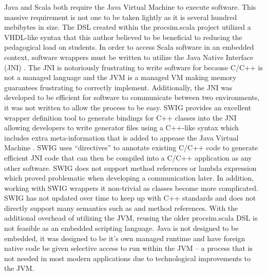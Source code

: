 Java and Scala both require the Java Virtual Machine to execute software. This massive requirement is not one to be taken lightly as it is several hundred mebibytes in size. The DSL created within the procsim.scala project utilized a VHDL-like syntax that this author believed to be beneficial to reducing the pedagogical load on students. In order to access Scala software in an embedded context, software wrappers must be written to utilize the Java Native Interface (JNI) \cite{Oracle:JNI}. The JNI is notoriously frustrating to write software for because C/C++ is not a managed language and the JVM is a managed VM making memory guarantees frustrating to correctly implement. Additionally, the JNI was developed to be efficient for software to communicate between two environments, it was not written to allow the process to be easy. SWIG provides an excellent wrapper definition tool to generate bindings for C++ classes into the JNI \cite{SWIG:Homepage} allowing developers to write generator files using a C++-like syntax which includes extra meta-information that is added to appease the Java Virtual Machine \cite{SWIG:Java}. SWIG uses ``directives'' to annotate existing C/C++ code to generate efficient JNI code that can then be compiled into a C/C++ application as any other software. SWIG does not support method references or lambda expression which proved problematic when developing a communication later. In addition, working with SWIG wrappers it non-trivial as classes become more complicated. SWIG has not updated over time to keep up with C++ standards and does not directly support many semantics such as  and method references. With the additional overhead of utilizing the JVM, reusing the older procsim.scala DSL is not feasible as an embedded scripting language. Java is not designed to be embedded, it was designed to be it's own managed runtime and have foreign native code be given selective access to run within the JVM -- a process that is not needed in most modern applications due to technological improvements to the JVM.

